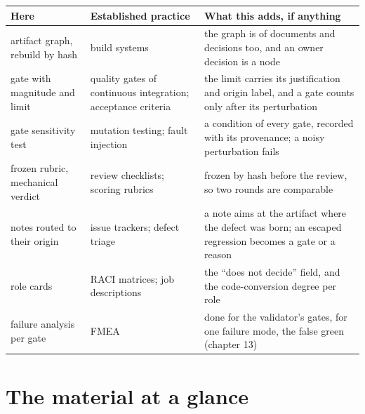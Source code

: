 \documentclass[
  american,
  10pt,
]{report}
\newcounter{none} %
\begin{document}
{\def\LTcaptype{none} %
\begin{longtable}[]{@{}
  >{\raggedright\arraybackslash}p{}
  >{\raggedright\arraybackslash}p{}
  >{\raggedright\arraybackslash}p{}@{}}
\toprule\noalign{}
\begin{minipage}[b]{\linewidth}\raggedright
Here
\end{minipage} & \begin{minipage}[b]{\linewidth}\raggedright
Established practice
\end{minipage} & \begin{minipage}[b]{\linewidth}\raggedright
What this adds, if anything
\end{minipage} \\
\midrule\noalign{}
\endhead
\bottomrule\noalign{}
\endlastfoot
artifact graph, rebuild by hash & build systems & the graph is of
documents and decisions too, and an owner decision is a node \\
gate with magnitude and limit & quality gates of continuous integration;
acceptance criteria & the limit carries its justification and origin
label, and a gate counts only after its perturbation \\
gate sensitivity test & mutation testing; fault injection & a condition
of every gate, recorded with its provenance; a noisy perturbation
fails \\
frozen rubric, mechanical verdict & review checklists; scoring rubrics &
frozen by hash before the review, so two rounds are comparable \\
notes routed to their origin & issue trackers; defect triage & a note
aims at the artifact where the defect was born; an escaped regression
becomes a gate or a reason \\
role cards & RACI matrices; job descriptions & the ``does not decide''
field, and the code-conversion degree per role \\
failure analysis per gate & FMEA & done for the validator's gates, for
one failure mode, the false green (chapter 13) \\
\end{longtable}
}

\chapter{The material at a glance}\label{the-material-at-a-glance}
\end{document}
